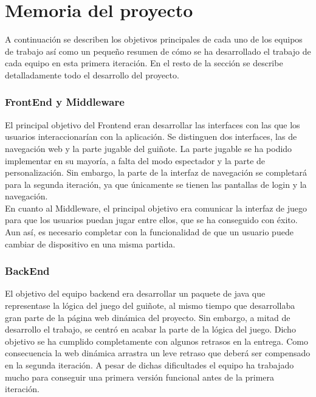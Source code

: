 \section{Memoria del proyecto}
\label{memoria}
A continuación se describen los objetivos principales de cada uno de los equipos de trabajo así como un pequeño resumen de cómo se ha desarrollado el trabajo de cada equipo en esta primera iteración. En el resto de la sección se describe detalladamente todo el desarrollo del proyecto.\\

\subsubsection*{FrontEnd y Middleware}
El principal objetivo del Frontend eran desarrollar las interfaces con las que los usuarios interaccionarían con la aplicación. Se distinguen dos interfaces, las de navegación web y la parte jugable del guiñote. La parte jugable se ha podido implementar en su mayoría, a falta del modo espectador y la parte de personalización. Sin embargo, la parte de la interfaz de navegación se completará para la segunda iteración, ya que únicamente se tienen las pantallas de login y la navegación.
\\
En cuanto al Middleware, el principal objetivo era comunicar la interfaz de juego para que los usuarios puedan jugar entre ellos, que se ha conseguido con éxito. Aun así, es necesario completar con la funcionalidad de que un usuario puede cambiar de dispositivo en una misma partida.

\subsubsection*{BackEnd}
El objetivo del equipo backend era desarrollar un paquete de java que representase la lógica del juego del guiñote, al mismo tiempo que desarrollaba gran parte de la página web dinámica del proyecto. Sin embargo, a mitad de desarrollo el trabajo, se centró en acabar la parte de la lógica del juego. Dicho objetivo se ha cumplido completamente con algunos retrasos en la entrega. Como consecuencia la web dinámica arrastra un leve retraso que deberá ser compensado en la segunda iteración. A pesar de dichas dificultades el equipo ha trabajado mucho para conseguir una primera versión funcional antes de la primera iteración.

